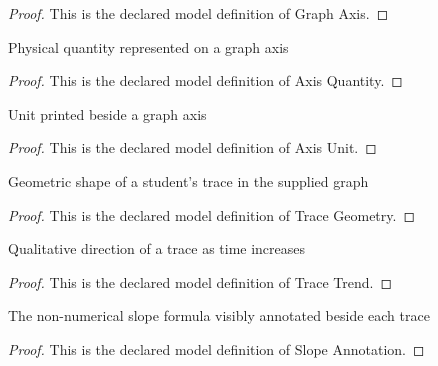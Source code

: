 \begin{proof}
  This is the declared model definition of Graph Axis.
\end{proof}
\begin{definition}
  \label{def:physics:phyx-mini-0829:phyxminiproblems-problemphyxmini0829-axisquantity}
  Physical quantity represented on a graph axis
\end{definition}
\begin{proof}
  This is the declared model definition of Axis Quantity.
\end{proof}
\begin{definition}
  \label{def:physics:phyx-mini-0829:phyxminiproblems-problemphyxmini0829-axisunit}
  Unit printed beside a graph axis
\end{definition}
\begin{proof}
  This is the declared model definition of Axis Unit.
\end{proof}
\begin{definition}
  \label{def:physics:phyx-mini-0829:phyxminiproblems-problemphyxmini0829-tracegeometry}
  Geometric shape of a student's trace in the supplied graph
\end{definition}
\begin{proof}
  This is the declared model definition of Trace Geometry.
\end{proof}
\begin{definition}
  \label{def:physics:phyx-mini-0829:phyxminiproblems-problemphyxmini0829-tracetrend}
  Qualitative direction of a trace as time increases
\end{definition}
\begin{proof}
  This is the declared model definition of Trace Trend.
\end{proof}
\begin{definition}
  \label{def:physics:phyx-mini-0829:phyxminiproblems-problemphyxmini0829-slopeannotation}
  The non-numerical slope formula visibly annotated beside each trace
\end{definition}
\begin{proof}
  This is the declared model definition of Slope Annotation.
\end{proof}
